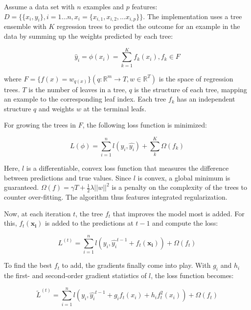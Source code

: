 \documentclass[
  11pt,
  a4paper,
  DIV=12,captions=tableheading,oneside,titlepage]{scrbook}
\begin{document}
Assume a data set with \(n\) examples and \(p\) features: \(D = \{\{x_i,y_i\}, i=1\ldots n, x_i=\{x_{i,1}, x_{i,2}, \ldots x_{i,p}\}\}\). The implementation uses a tree ensemble with \(K\) regression trees to predict the outcome for an example in the data by summing up the weights predicted by each tree:

\begin{equation}
\hat{y}_i = \phi(x_i) = \sum_{k=1}^K f_k(x_i), f_k \in F
\label{eq:gbm-ensemble}
\end{equation}

where \(F = \{f(x) = w_{q(x)}\} (q: \mathbb{R}^m \rightarrow T, w \in \mathbb{R}^T)\) is the space of regression trees. \(T\) is the number of leaves in a tree, \(q\) is the structure of each tree, mapping an example to the corresponding leaf index. Each tree \(f_k\) has an independent structure \(q\) and weights \(w\) at the terminal leafs.

For growing the trees in \(F\), the following loss function is minimized:

\begin{equation}
L(\phi) = \sum_{i=1}^n l(y_i, \hat{y_i}) + \sum_k^K \Omega(f_k)
\label{eq:gbm-loss}
\end{equation}

Here, \(l\) is a differentiable, convex loss function that measures the difference between predictions and true values. Since \(l\) is convex, a global minimum is guaranteed. \(\Omega(f) = \gamma T + \frac{1}{2}\lambda||w||^2\) is a penalty on the complexity of the trees to counter over-fitting. The algorithm thus features integrated regularization.

Now, at each iteration \(t\), the tree \(f_t\) that improves the model most is added. For this, \(f_t(\mathbf{x_i})\) is added to the predictions at \(t-1\) and compute the loss:

\begin{equation}
L^{(t)} = \sum_{i=1}^n l(y_i, \hat{y_i}^{t-1} + f_t(\mathbf{x_i})) +\Omega(f_t)
\label{eq:gbm-iterate}
\end{equation}

To find the best \(f_t\) to add, the gradients finally come into play. With \(g_i\) and \(h_i\) the first- and second-order gradient statistics of \(l\), the loss function becomes:

\begin{equation}
\tilde{L}^{(t)} = \sum_{i=1}^n l(y_i, \hat{y_i}^{t-1} + g_if_t(x_i) + h_i f_t^2(x_i)) +\Omega(f_t)
\label{eq:gbm-grad}
\end{equation}
\end{document}
